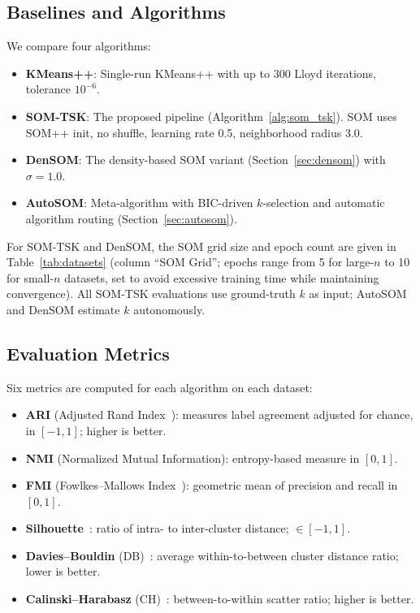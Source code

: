 \documentclass[journal]{IEEEtran}
\begin{document}
\subsection{Baselines and Algorithms}

We compare four algorithms:
\begin{itemize}
  \item \textbf{KMeans++}: Single-run KMeans++ with up to 300 Lloyd iterations, tolerance $10^{-6}$.
  \item \textbf{SOM-TSK}: The proposed pipeline (Algorithm~\ref{alg:som_tsk}). SOM uses SOM++ init, no shuffle, learning rate 0.5, neighborhood radius 3.0.
  \item \textbf{DenSOM}: The density-based SOM variant (Section~\ref{sec:densom}) with $\sigma = 1.0$.
  \item \textbf{AutoSOM}: Meta-algorithm with BIC-driven $k$-selection and automatic algorithm routing (Section~\ref{sec:autosom}).
\end{itemize}

For SOM-TSK and DenSOM, the SOM grid size and epoch count are given in Table~\ref{tab:datasets} (column ``SOM Grid''; epochs range from 5 for large-$n$ to 10 for small-$n$ datasets, set to avoid excessive training time while maintaining convergence). All SOM-TSK evaluations use ground-truth $k$ as input; AutoSOM and DenSOM estimate $k$ autonomously.

\subsection{Evaluation Metrics}

Six metrics are computed for each algorithm on each dataset:
\begin{itemize}
  \item \textbf{ARI} (Adjusted Rand Index~\cite{hubert1985comparing}): measures label agreement adjusted for chance, in $[-1,1]$; higher is better.
  \item \textbf{NMI} (Normalized Mutual Information): entropy-based measure in $[0,1]$.
  \item \textbf{FMI} (Fowlkes--Mallows Index~\cite{fowlkes1983method}): geometric mean of precision and recall in $[0,1]$.
  \item \textbf{Silhouette}~\cite{rousseeuw1987silhouettes}: ratio of intra- to inter-cluster distance; $\in [-1,1]$.
  \item \textbf{Davies--Bouldin} (DB)~\cite{davies1979cluster}: average within-to-between cluster distance ratio; lower is better.
  \item \textbf{Calinski--Harabasz} (CH)~\cite{calinski1974dendrite}: between-to-within scatter ratio; higher is better.
\end{itemize}
\end{document}
